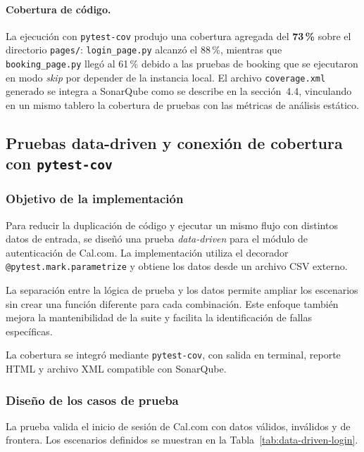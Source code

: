 \documentclass{article}
\begin{document}
\paragraph{Cobertura de código.}
La ejecución con \texttt{pytest-cov} produjo una cobertura agregada del
\textbf{73\,\%} sobre el directorio \texttt{pages/}:
\texttt{login\_page.py} alcanzó el 88\,\%, mientras que
\texttt{booking\_page.py} llegó al 61\,\% debido a las pruebas de
booking que se ejecutaron en modo \textit{skip} por depender de la
instancia local. El archivo \texttt{coverage.xml} generado se integra
a SonarQube como se describe en la sección~4.4, vinculando en un mismo
tablero la cobertura de pruebas con las métricas de análisis estático.

\subsection{Pruebas data-driven y conexión de cobertura con \texttt{pytest-cov}}

\subsubsection{Objetivo de la implementación}

Para reducir la duplicación de código y ejecutar un mismo flujo con distintos datos de entrada, se diseñó una prueba \textit{data-driven} para el módulo de autenticación de Cal.com. La implementación utiliza el decorador \texttt{@pytest.mark.parametrize} y obtiene los datos desde un archivo CSV externo.

La separación entre la lógica de prueba y los datos permite ampliar los escenarios sin crear una función diferente para cada combinación. Este enfoque también mejora la mantenibilidad de la suite y facilita la identificación de fallas específicas.

La cobertura se integró mediante \texttt{pytest-cov}, con salida en terminal, reporte HTML y archivo XML compatible con SonarQube.

\subsubsection{Diseño de los casos de prueba}

La prueba valida el inicio de sesión de Cal.com con datos válidos, inválidos y de frontera. Los escenarios definidos se muestran en la Tabla~\ref{tab:data-driven-login}.
\end{document}
